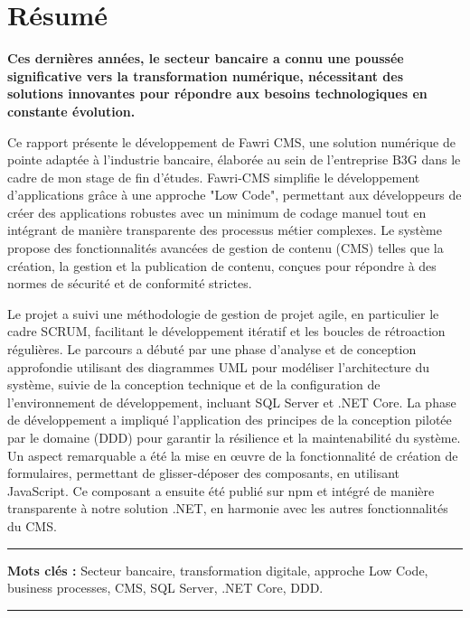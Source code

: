 \chapter*{Résumé}
\bf \normalfont
\hspace{\parindent} Ces dernières années, le secteur bancaire a connu une poussée significative vers la transformation numérique, nécessitant des solutions innovantes pour répondre aux besoins technologiques en constante évolution.

Ce rapport présente le développement de Fawri CMS, une solution numérique de pointe adaptée à l'industrie bancaire, élaborée au sein de l'entreprise B3G dans le cadre de mon stage de fin d'études. Fawri-CMS simplifie le développement d'applications grâce à une approche "Low Code", permettant aux développeurs de créer des applications robustes avec un minimum de codage manuel tout en intégrant de manière transparente des processus métier complexes. Le système propose des fonctionnalités avancées de gestion de contenu (CMS) telles que la création, la gestion et la publication de contenu, conçues pour répondre à des normes de sécurité et de conformité strictes.

Le projet a suivi une méthodologie de gestion de projet agile, en particulier le cadre SCRUM, facilitant le développement itératif et les boucles de rétroaction régulières. Le parcours a débuté par une phase d’analyse et de conception approfondie utilisant des diagrammes UML pour modéliser l’architecture du système, suivie de la conception technique et de la configuration de l’environnement de développement, incluant SQL Server et .NET Core.
La phase de développement a impliqué l'application des principes de la conception pilotée par le domaine (DDD) pour garantir la résilience et la maintenabilité du système. Un aspect remarquable a été la mise en œuvre de la fonctionnalité de création de formulaires, permettant de glisser-déposer des composants, en utilisant JavaScript. Ce composant a ensuite été publié sur npm et intégré de manière transparente à notre solution .NET, en harmonie avec les autres fonctionnalités du CMS.

\noindent\rule[2pt]{\textwidth}{0.5pt}

\textbf{Mots clés :}
Secteur bancaire, transformation digitale, approche Low Code, business processes, CMS, SQL Server, .NET Core, DDD.
\\
\noindent\rule[2pt]{\textwidth}{0.5pt}
